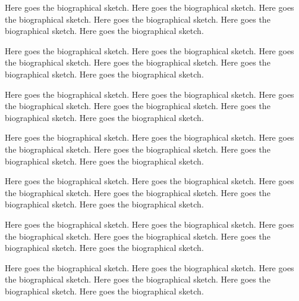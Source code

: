 

Here goes the biographical sketch. Here goes the biographical sketch.
Here goes the biographical sketch. Here goes the biographical sketch.
Here goes the biographical sketch. Here goes the biographical sketch.

Here goes the biographical sketch. Here goes the biographical sketch.
Here goes the biographical sketch. Here goes the biographical sketch.
Here goes the biographical sketch. Here goes the biographical sketch.

Here goes the biographical sketch. Here goes the biographical sketch.
Here goes the biographical sketch. Here goes the biographical sketch.
Here goes the biographical sketch. Here goes the biographical sketch.

Here goes the biographical sketch. Here goes the biographical sketch.
Here goes the biographical sketch. Here goes the biographical sketch.
Here goes the biographical sketch. Here goes the biographical sketch.

Here goes the biographical sketch. Here goes the biographical sketch.
Here goes the biographical sketch. Here goes the biographical sketch.
Here goes the biographical sketch. Here goes the biographical sketch.

Here goes the biographical sketch. Here goes the biographical sketch.
Here goes the biographical sketch. Here goes the biographical sketch.
Here goes the biographical sketch. Here goes the biographical sketch.

Here goes the biographical sketch. Here goes the biographical sketch.
Here goes the biographical sketch. Here goes the biographical sketch.
Here goes the biographical sketch. Here goes the biographical sketch.
